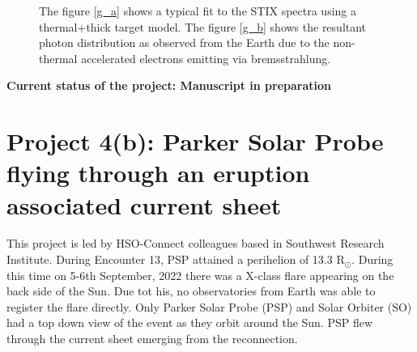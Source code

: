 \documentclass[a4paper,11pt]{article}
\begin{document}
\begin{figure}[ht!]
    \centering
    \caption{The figure \ref{g_a} shows a typical fit to the STIX spectra using a thermal+thick target model. The figure \ref{g_b} shows the resultant photon distribution as observed from the Earth due to the non-thermal accelerated electrons emitting via bremsstrahlung.}
    \label{fig:fit}
\end{figure}

\textbf{Current status of the project: Manuscript in preparation}

\section*{Project 4(b): Parker Solar Probe flying through an eruption associated current sheet}

This project is led by HSO-Connect colleagues based in Southwest Research Institute. During Encounter 13, PSP attained a perihelion of 13.3 $\mathrm{R_{\odot}}$. During this time on 5-6th September, 2022 there was a X-class flare appearing on the back side of the Sun. Due tot his, no observatories from Earth was able to register the flare directly. Only Parker Solar Probe (PSP) and Solar Orbiter (SO) had a top down view of the event as they orbit around the Sun. PSP flew through the current sheet emerging from the reconnection. 
\end{document}

